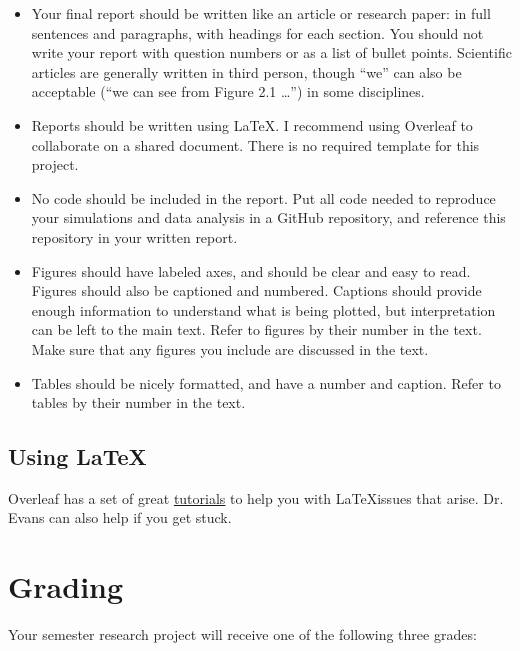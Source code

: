 \documentclass[11pt]{article}
\begin{document}
\begin{itemize}
\item Your final report should be written like an article or research paper: in full sentences and paragraphs, with headings for each section. You should not write your report with question numbers or as a list of bullet points. Scientific articles are generally written in third person, though “we” can also be acceptable (“we can see from Figure 2.1 …”) in some disciplines.

\item Reports should be written using \LaTeX. I recommend using Overleaf to collaborate on a shared document. There is no required template for this project.

\item No code should be included in the report. Put all code needed to reproduce your simulations and data analysis in a GitHub repository, and reference this repository in your written report.

\item Figures should have labeled axes, and should be clear and easy to read. Figures should also be captioned and numbered. Captions should provide enough information to understand what is being plotted, but interpretation can be left to the main text. Refer to figures by their number in the text. Make sure that any figures you include are discussed in the text.

\item Tables should be nicely formatted, and have a number and caption. Refer to tables by their number in the text.
\end{itemize}

\subsection*{Using LaTeX}

Overleaf has a set of great \href{https://www.overleaf.com/learn/latex/Tutorials}{tutorials} to help you with \LaTeX issues that arise. Dr. Evans can also help if you get stuck.

\vspace{0.5cm}

\section*{Grading}

Your semester research project will receive one of the following three grades:
\end{document}
